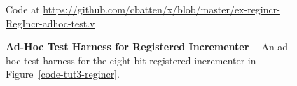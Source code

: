 
\begin{figure}

  

  \centerline{\small Code at
    \url{https://github.com/cbatten/x/blob/master/ex-regincr-RegIncr-adhoc-test.v}}

  \caption{\textbf{Ad-Hoc Test Harness for Registered Incrementer --} An
    ad-hoc test harness for the eight-bit registered incrementer in
    Figure~\ref{code-tut3-regincr}.}
  \label{code-tut3-regincr-adhoc-test}

\end{figure}

